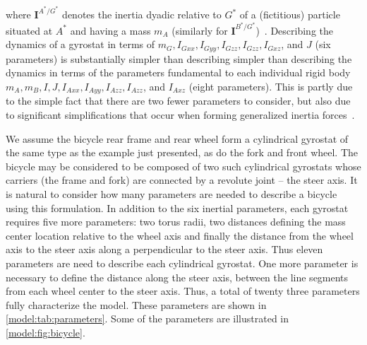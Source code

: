 where $\bm{I}^{A^*/G^*}$ denotes the inertia dyadic relative to $G^*$ of a
(fictitious) particle situated at $A^*$ and having a mass $m_A$ (similarly for
$\bm{I}^{B^*/G^*}$)~\cite{Kane1985}. Describing the dynamics of a gyrostat in
terms of $m_G, I_{Gxx}, I_{Gyy}, I_{Gzz}, I_{Gzz}, I_{Gxz}$, and $J$ (six
parameters) is substantially simpler than describing simpler than describing
the dynamics in terms of the parameters fundamental to each individual rigid
body $m_A, m_B, I, J, I_{Axx}, I_{Ayy}, I_{Azz}, I_{Azz}$, and $I_{Axz}$ (eight
parameters). This is partly due to the simple fact that there are two fewer
parameters to consider, but also due to significant simplifications that occur
when forming generalized inertia forces~\cite{Mitiguy2001}.

We assume the bicycle rear frame and rear wheel form a cylindrical gyrostat of
the same type as the example just presented, as do the fork and front wheel.
The bicycle may be considered to be composed of two such cylindrical gyrostats
whose carriers (the frame and fork) are connected by a revolute joint -- the
steer axis. It is natural to consider how many parameters are needed to
describe a bicycle using this formulation. In addition to the six inertial
parameters, each gyrostat requires five more parameters: two torus radii, two
distances defining the mass center location relative to the wheel axis and
finally the distance from the wheel axis to the steer axis along a
perpendicular to the steer axis. Thus eleven parameters are need to describe
each cylindrical gyrostat. One more parameter is necessary to define the
distance along the steer axis, between the line segments from each wheel center
to the steer axis. Thus, a total of twenty three parameters fully characterize
the model. These parameters are shown in \autoref{model:tab:parameters}. Some
of the parameters are illustrated in \autoref{model:fig:bicycle}.

